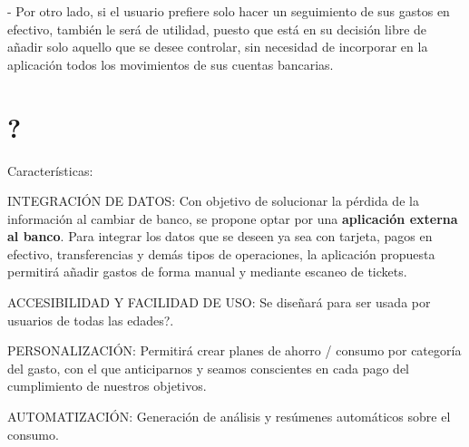 - Por otro lado, si el usuario prefiere solo hacer un seguimiento de sus gastos en efectivo, también le será de utilidad, puesto que está en su decisión libre de añadir solo aquello que se desee controlar, sin necesidad de incorporar en la aplicación todos los movimientos de sus  cuentas bancarias.

\section{?}
Características:

INTEGRACIÓN DE DATOS:
Con objetivo de solucionar la pérdida de la información al cambiar de banco, 
se propone optar por una \textbf{aplicación externa al banco}. 
Para integrar los datos que se deseen ya sea con tarjeta, pagos en efectivo, transferencias 
y demás tipos de operaciones, la aplicación propuesta permitirá añadir gastos de forma manual 
y mediante escaneo de tickets. 

ACCESIBILIDAD Y FACILIDAD DE USO:
Se diseñará para ser usada por usuarios de todas las edades?.

PERSONALIZACIÓN: 
Permitirá crear planes de ahorro / consumo por categoría del gasto, con el que anticiparnos y 
seamos conscientes en cada pago del cumplimiento de nuestros objetivos.

AUTOMATIZACIÓN:
Generación de análisis y resúmenes automáticos sobre el consumo.
